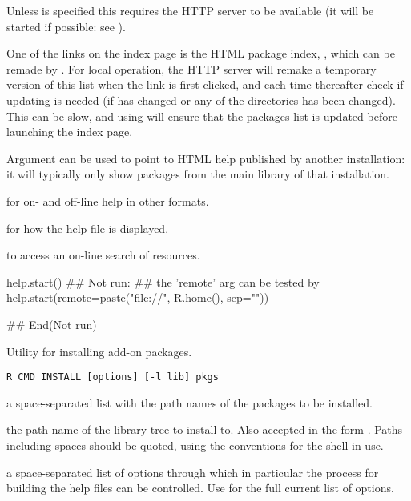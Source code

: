 %
\begin{Details}\relax
Unless  is specified this requires the HTTP server to be
available (it will be started if possible: see
).

One of the links on the index page is the HTML package index,
, which can be remade by
.  For local operation,
the HTTP server will remake a temporary version of this list when the
link is first clicked, and each time thereafter check if updating is
needed (if  has changed or any of the
directories has been changed).  This can be slow, and using
 will ensure that the packages list is updated
before launching the index page.

Argument  can be used to point to HTML help published by
another \R{} installation: it will typically only show packages from the
main library of that installation.
\end{Details}
%
\begin{SeeAlso}\relax
{} for on- and off-line help in other formats.

 for how the help file is displayed.

 to access an on-line search of \R{} resources.
\end{SeeAlso}
%
\begin{Examples}
\begin{ExampleCode}
help.start()
## Not run: 
## the 'remote' arg can be tested by
help.start(remote=paste("file://", R.home(), sep=""))

## End(Not run)
\end{ExampleCode}
\end{Examples}
%
\begin{Description}\relax
Utility for installing add-on packages.
\end{Description}
%
\begin{Usage}
\begin{verbatim}
R CMD INSTALL [options] [-l lib] pkgs
\end{verbatim}
\end{Usage}
%
\begin{Arguments}
\begin{ldescription}
\item[\code{pkgs}] a space-separated list with the path names of the packages to be
installed.
\item[\code{lib}] the path name of the \R{} library tree to install to.  Also
accepted in the form .  Paths including spaces should
be quoted, using the conventions for the shell in use.
\item[\code{options}] a space-separated list of options through which in
particular the process for building the help files can be controlled.
Use  for the full current list of options.
\end{ldescription}
\end{Arguments}
